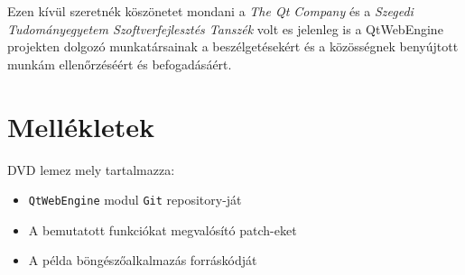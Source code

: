 \documentclass[12pt]{report}
\begin{document}
Ezen kívül szeretnék köszönetet mondani a \textit{The Qt Company} és a
\textit{Szegedi Tudományegyetem Szoftverfejlesztés Tanszék} volt es jelenleg is a QtWebEngine
projekten dolgozó munkatársainak a beszélgetésekért és a közösségnek benyújtott munkám
ellenőrzéséért és befogadásáért.


\chapter*{Mellékletek}

\noindent
DVD lemez mely tartalmazza:
\begin{itemize}
    \item \texttt{QtWebEngine} modul \texttt{Git} repository-ját
    \item A bemutatott funkciókat megvalósító patch-eket
    \item A példa böngészőalkalmazás forráskódját
\end{itemize}
\end{document}
